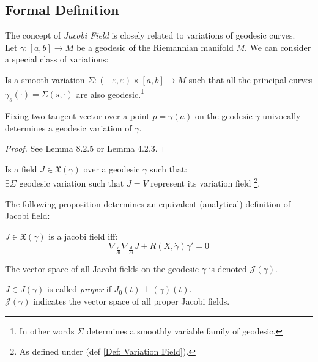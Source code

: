 \documentclass[a4paper,12pt]{scrartcl}    %
\begin{document}
\subsection{Formal Definition}
The concept of \emph{Jacobi Field} is closely related to variations of geodesic curves.
\\
Let $\gamma:[a,b]\rightarrow M$ be a geodesic of the Riemannian manifold $M$. We can consider a special class of variations:

\begin{definition}
Is a smooth variation $\Sigma:(-\varepsilon, \varepsilon) \times [a,b] \rightarrow M$ such that all the principal curves $\gamma_s (\cdot) = \Sigma(s,\cdot)$ are also geodesic.\footnote{In other words $\Sigma$ determines a smoothly variable family of geodesic.}
\end{definition}

\begin{proposition}
 Fixing two tangent vector over a point $p= \gamma(a)$ on the geodesic $\gamma$ univocally determines 
 a geodesic variation of $\gamma$.
\end{proposition}
\begin{proof}
 See \cite{Abate2011} Lemma $8.2.5$  or \cite{Jost2005} Lemma $4.2.3$.
\end{proof}

\begin{definition}
 Is a field $J \in \mathfrak{X}(\gamma)$ over a geodesic $\gamma$ such that:
 \\
 $\exists \Sigma$ geodesic variation such that $J=V$ represent its variation field \footnote{As defined under (def \ref{Def: Variation Field}).}.
\end{definition}
The following proposition determines an equivalent (analytical) definition of Jacobi field:

\begin{proposition}
$$ $$
 $J \in \mathfrak{X}(\dot{\gamma})$ is a jacobi field iff:
 \begin{displaymath}
   \nabla_{\frac{\textrm{d}}{\textrm{d}t}} \nabla_{\frac{\textrm{d}}{\textrm{d}t}} J  + R(X,\dot{\gamma}) \gamma' = 0
 \end{displaymath}
\end{proposition}

\begin{notationfix}
The vector space of all Jacobi fields on the geodesic $\gamma$ is denoted $\mathcal{J}(\gamma)$.
\end{notationfix}
\begin{notationfix}
 $J \in J(\gamma)$ is called \emph{proper} if $J_0(t)\perp \dot{(\gamma)}(t)$.
\\
 $\mathcal{J}(\gamma)$ indicates the vector space of all proper Jacobi fields.
\end{notationfix}
\end{document}
